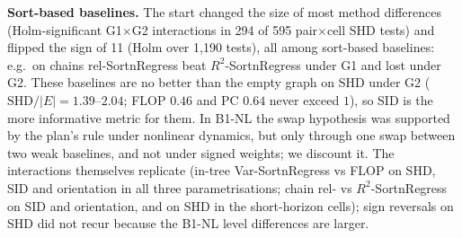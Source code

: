 \documentclass{article}
\theoremstyle{plain}
\theoremstyle{definition}
\theoremstyle{remark}
\begin{document}
\textbf{Sort-based baselines.} The start changed the size of most method
differences (Holm-significant G1$\times$G2 interactions in 294 of 595
pair$\times$cell SHD tests) and flipped the sign of 11 (Holm over 1{,}190
tests), all among sort-based baselines: e.g.\ on chains rel-SortnRegress beat
$R^2$-SortnRegress under G1 and lost under G2. These baselines are no better
than the empty graph on SHD under G2 ($\mathrm{SHD}/|E|=1.39$--$2.04$; FLOP
$0.46$ and PC $0.64$ never exceed $1$), so SID is the more informative metric
for them. In B1-NL the swap hypothesis was supported by the plan's rule under
nonlinear dynamics, but only through one swap between two weak baselines, and
not under signed weights; we discount it. The interactions themselves
replicate (in-tree Var-SortnRegress vs FLOP on SHD, SID and orientation in all
three parametrisations; chain rel- vs $R^2$-SortnRegress on SID and
orientation, and on SHD in the short-horizon cells); sign reversals on SHD did
not recur because the B1-NL level differences are larger.
\end{document}
